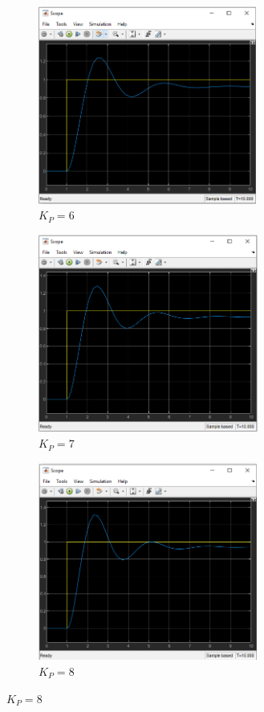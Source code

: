 \documentclass{article}
\begin{document}
		\begin{figure}[h]
			\begin{subfigure}{0.5\textwidth}
				\includegraphics[width=1\linewidth, height=6.5cm]{2_3c/6.png} 
				\caption{$K_P = 6$}
				\label{fig:subim1}
			\end{subfigure}
			\begin{subfigure}{0.5\textwidth}
				\includegraphics[width=1\linewidth, height=6.5cm]{2_3c/7.png}
				\caption{$K_P = 7$}
				\label{fig:subim2}
			\end{subfigure}
			\begin{subfigure}{0.5\textwidth}
				\includegraphics[width=1\linewidth, height=6.5cm]{2_3c/8.png} 
				\caption{$K_P = 8$}

\end{subfigure}
\end{figure}
\end{document}
